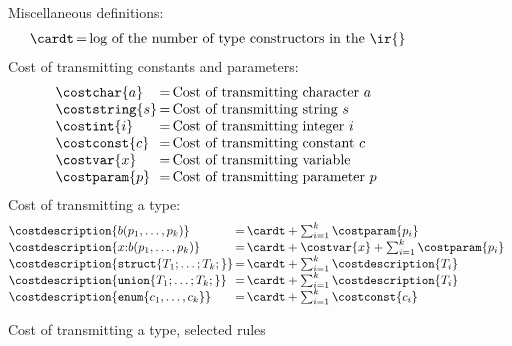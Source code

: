 \begin{figure}
Miscellaneous definitions:
\[
\begin{array}{@{\,}l@{\,}c@{\,}l}
\cardt &=& \mbox{log of the number of type constructors in the \ir{}}
\end{array}
\]
Cost of transmitting constants and parameters:
\[
\begin {array} {@{}l@{\,}c@{\,}l}
\costchar{a}  &=& \mbox{Cost of transmitting character } a \\
\coststring{s}  &=& \mbox{Cost of transmitting string } s \\
\costint{i}  &=& \mbox{Cost of transmitting integer } i \\
\costconst{c}  &=& \mbox{Cost of transmitting constant } c \\
\costvar{x} &=& \mbox{Cost of transmitting variable } \\
\costparam{p}  &=& \mbox{Cost of transmitting parameter } p \\
\end{array}
\]
Cost of transmitting a type:
\[
\begin{array}{@{}l@{\,}c@{\,}l}
\costdescription{b(p_1,\ldots,p_k)} &=& 
  \cardt + \sum_{i=1}^{k} \costparam{p_i} \\
\costdescription{x{:}b(p_1,\ldots,p_k)} &=& 
  \cardt + \costvar{x} + \sum_{i=1}^{k} \costparam{p_i} \\
\costdescription{\mathtt{struct \{} T_1;\ldots ;T_k; \mathtt{\}}} &=& 
  \cardt + \sum_{i=1}^{k} \costdescription{T_i} \\
\costdescription{\mathtt{union \{} T_1; \ldots ;T_k; \mathtt{\}}} &=& 
  \cardt + \sum_{i=1}^{k} \costdescription{T_i} \\
\costdescription{\mathtt{enum \{} c_1,\ldots,c_k \mathtt{\}}} &=& 
  \cardt + \sum_{i=1}^{k} \costconst{c_i} \\
\end{array}
\]
\caption {Cost of transmitting a type, selected rules}
\label{fig:cost-type}
\end{figure}

